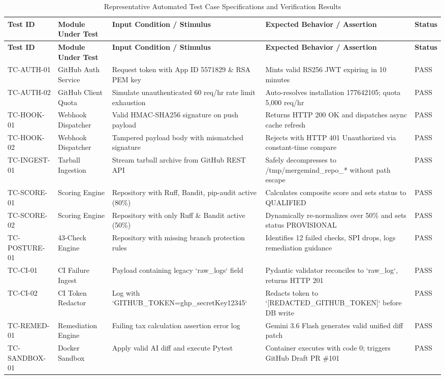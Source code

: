 \documentclass[12pt,a4paper,oneside]{report}
\begin{document}
\begin{longtable}{p{} p{} p{} p{} p{}}
\caption{Representative Automated Test Case Specifications and Verification Results} \label{tab:test-cases} \\
\toprule
\textbf{Test ID} & \textbf{Module Under Test} & \textbf{Input Condition / Stimulus} & \textbf{Expected Behavior / Assertion} & \textbf{Status} \\
\midrule
\endfirsthead
\toprule
\textbf{Test ID} & \textbf{Module Under Test} & \textbf{Input Condition / Stimulus} & \textbf{Expected Behavior / Assertion} & \textbf{Status} \\
\midrule
\endhead
\bottomrule
\endfoot
\bottomrule
\endlastfoot

TC-AUTH-01 & GitHub Auth Service & Request token with App ID 5571829 \& RSA PEM key & Mints valid RS256 JWT expiring in 10 minutes & PASS \\
\addlinespace
TC-AUTH-02 & GitHub Client Quota & Simulate unauthenticated 60 req/hr rate limit exhaustion & Auto-resolves installation 177642105; quota 5,000 req/hr & PASS \\
\addlinespace
TC-HOOK-01 & Webhook Dispatcher & Valid HMAC-SHA256 signature on push payload & Returns HTTP 200 OK and dispatches async cache refresh & PASS \\
\addlinespace
TC-HOOK-02 & Webhook Dispatcher & Tampered payload body with mismatched signature & Rejects with HTTP 401 Unauthorized via constant-time compare & PASS \\
\addlinespace
TC-INGEST-01 & Tarball Ingestion & Stream tarball archive from GitHub REST API & Safely decompresses to /tmp/mergemind\_repo\_* without path escape & PASS \\
\addlinespace
TC-SCORE-01 & Scoring Engine & Repository with Ruff, Bandit, pip-audit active (80\%) & Calculates composite score and sets status to QUALIFIED & PASS \\
\addlinespace
TC-SCORE-02 & Scoring Engine & Repository with only Ruff \& Bandit active (50\%) & Dynamically re-normalizes over 50\% and sets status PROVISIONAL & PASS \\
\addlinespace
TC-POSTURE-01 & 43-Check Engine & Repository with missing branch protection rules & Identifies 12 failed checks, SPI drops, logs remediation guidance & PASS \\
\addlinespace
TC-CI-01 & CI Failure Ingest & Payload containing legacy `raw\_logs` field & Pydantic validator reconciles to `raw\_log`, returns HTTP 201 & PASS \\
\addlinespace
TC-CI-02 & CI Token Redactor & Log with `GITHUB\_TOKEN=ghp\_secretKey12345` & Redacts token to `[REDACTED\_GITHUB\_TOKEN]` before DB write & PASS \\
\addlinespace
TC-REMED-01 & Remediation Engine & Failing tax calculation assertion error log & Gemini 3.6 Flash generates valid unified diff patch & PASS \\
\addlinespace
TC-SANDBOX-01 & Docker Sandbox & Apply valid AI diff and execute Pytest & Container executes with code 0; triggers GitHub Draft PR \#101 & PASS \\
\end{longtable}
\end{document}
